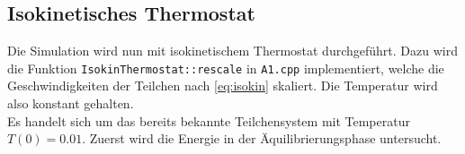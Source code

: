 \FloatBarrier

\subsection{Isokinetisches Thermostat}
Die Simulation wird nun mit isokinetischem Thermostat durchgeführt.
Dazu wird die Funktion \texttt{IsokinThermostat::rescale} in \texttt{A1.cpp} implementiert, welche die Geschwindigkeiten der Teilchen nach \autoref{eq:isokin} skaliert.
Die Temperatur wird also konstant gehalten.
\\
Es handelt sich um das bereits bekannte Teilchensystem mit Temperatur $T(0)=0.01$.
Zuerst wird die Energie in der Äquilibrierungsphase untersucht.
